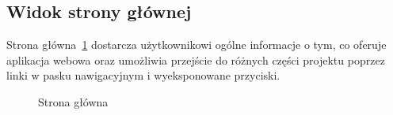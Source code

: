 \documentclass[shortabstract]{iithesis}
\begin{document}
\subsection{Widok strony głównej}
Strona główna~\ref{fig:view_home_page} dostarcza użytkownikowi ogólne informacje o tym, co oferuje aplikacja webowa oraz umożliwia przejście do różnych części projektu poprzez linki w pasku nawigacyjnym i wyeksponowane przyciski.

\begin{figure}[H]
    \centering
    \hfill
    \caption{Strona główna}
    \label{fig:view_home_page}
\end{figure}
\end{document}
